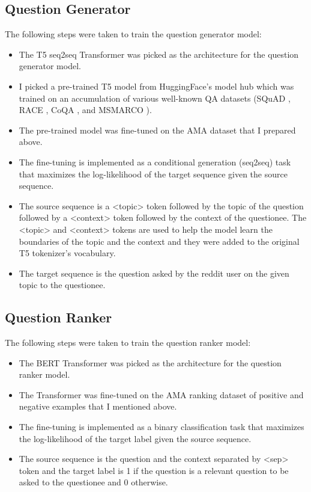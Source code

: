 \documentclass[paper=a4, fontsize=11pt]{scrartcl}
\numberwithin{equation}{section}		%
\numberwithin{figure}{section}			%
\numberwithin{table}{section}				%
\begin{document}
\subsection{Question Generator}
The following steps were taken to train the question generator model:
\begin{itemize}
  \item The T5 seq2seq Transformer \cite{raffel2020exploring} was picked as the architecture for the question generator model.
  \item I picked a pre-trained T5 model from HuggingFace's model hub which was trained on an accumulation of various well-known QA datasets (SQuAD \cite{rajpurkar2016squad}, RACE \cite{lai2017race}, CoQA \cite{reddy2019coqa}, and MSMARCO \cite{nguyen2016ms}).
  \item The pre-trained model was fine-tuned on the AMA dataset that I prepared above.
  \item The fine-tuning is implemented as a conditional generation (seq2seq) task that maximizes the log-likelihood of the target sequence given the source sequence.
  \item The source sequence is a <topic> token followed by the topic of the question followed by a <context> token followed by the context of the questionee. The <topic> and <context> tokens are used to help the model learn the boundaries of the topic and the context and they were added to the original T5 tokenizer's vocabulary.
  \item The target sequence is the question asked by the reddit user on the given topic to the questionee.
\end{itemize}

\subsection{Question Ranker}
The following steps were taken to train the question ranker model:
\begin{itemize}
  \item The BERT Transformer was picked as the architecture for the question ranker model.
  \item The Transformer was fine-tuned on the AMA ranking dataset of positive and negative examples that I mentioned above.
  \item The fine-tuning is implemented as a binary classification task that maximizes the log-likelihood of the target label given the source sequence.
  \item The source sequence is the question and the context separated by <sep> token and the target label is 1 if the question is a relevant question to be asked to the questionee and 0 otherwise.
\end{itemize}
\end{document}
